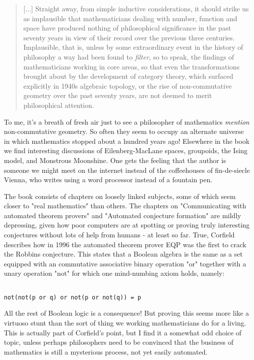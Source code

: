 \begin{quote}
     [...] Straight away, from simple inductive considerations, 
     it should strike us as implausible that mathematicians 
     dealing with number, function and space have produced 
     nothing of philosophical significance in the past seventy 
     years in view of their record over the previous three centuries.
     Implausible, that is, unless by some extraordinary event 
     in the history of philosophy a way had been found to \emph{filter},
     so to speak, the findings of mathematicians working in core
     areas, so that even the transformations brought about by
     the development of category theory, which surfaced explicitly
     in 1940s algebraic topology, or the rise of non-commutative
     geometry over the past seventy years, are not deemed to merit
     philosophical attention.  

\end{quote}
To me, it's a breath of fresh air just to see a philosopher
of mathematics \emph{mention} non-commutative geometry.  So often 
they seem to occupy an alternate universe in which mathematics 
stopped about a hundred years ago!  Elsewhere in the book 
we find interesting discussions of Eilenberg-MacLane spaces, 
groupoids, the Ising model, and Monstrous Moonshine.  One
gets the feeling that the author is someone we might meet 
on the internet instead of the coffeehouses of fin-de-siecle 
Vienna, who writes using a word processor instead of
a fountain pen.    

The book consists of chapters on loosely linked subjects,
some of which seem closer to "real mathematics" than others.
The chapters on "Communicating with automated theorem provers" 
and "Automated conjecture formation" are mildly depressing, 
given how poor computers are at spotting or proving truly 
interesting conjectures without lots of help from humans -
at least so far.  True, Corfield describes how in 1996 the 
automated theorem prover EQP was the first to crack the 
Robbins conjecture.  This states that a Boolean algebra is 
the same as a set equipped with an commutative associative 
binary operation "or" together with a unary operation "not" 
for which one mind-numbing axiom holds, namely:


\begin{verbatim}

not(not(p or q) or not(p or not(q)) = p
\end{verbatim}
    
All the rest of Boolean logic is a consequence!   But proving 
this seems more like a virtuoso stunt than the sort of thing 
we working mathematicians do for a living.  This is actually 
part of Corfield's point, but I find it a somewhat odd choice 
of topic, unless perhaps philosophers need to be convinced 
that the business of mathematics is still a mysterious process, 
not yet easily automated.

